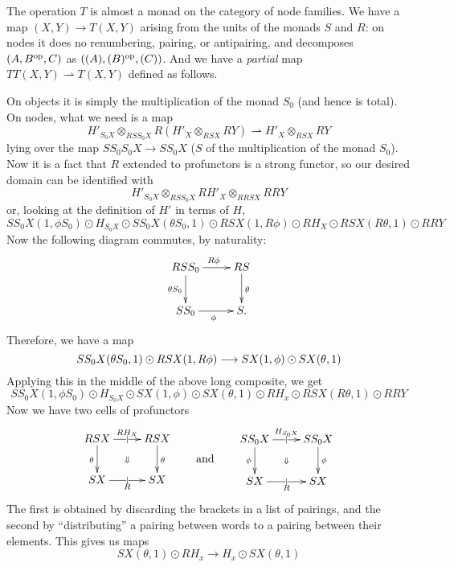 \documentclass{amsart}
\begin{document}
The operation $T$ is almost a monad on the category of node families.
We have a map $(X,Y) \to T(X,Y)$ arising from the units of the monads $S$ and $R$: on nodes it does no renumbering, pairing, or antipairing, and decomposes $(A,B^{\mathrm{op}},C)$ as $((A),(B)^{\mathrm{op}},(C))$.
And we have a \emph{partial} map $TT(X,Y)\rightharpoonup T(X,Y)$ defined as follows.

On objects it is simply the multiplication of the monad $S_0$ (and hence is total).
On nodes, what we need is a map
\[H'_{S_0 X} \otimes_{RSS_0X} R(H'_X \otimes_{RSX} RY) \rightharpoonup H'_X \otimes_{RSX} RY\]
lying over the map $SS_0S_0 X \to SS_0 X$ ($S$ of the multiplication of the monad $S_0$).
Now it is a fact that $R$ extended to profunctors is a strong functor, so our desired domain can be identified with
\[ H'_{S_0 X} \otimes_{RSS_0X} RH'_X \otimes_{RRSX} RRY \]
or, looking at the definition of $H'$ in terms of $H$,
\[ {SS_0X}(1,\phi S_0) \odot %
  H_{S_0 X} \odot %
  SS_0X(\theta S_0,1) \odot %
  RSX(1,R\phi)\odot %
  R H_X \odot %
  RSX(R\theta,1) \odot %
  RRY \]
Now the following diagram commutes, by naturality:
\begin{equation*}
  \vcenter{\xymatrix{
      RSS_0 \ar[r]^{R\phi}\ar[d]_{\theta S_0} &
      RS\ar[d]^{\theta}\\
      SS_0\ar[r]_{\phi} &
      S.
    }}
\end{equation*}
Therefore, we have a map
\[SS_0X(\theta S_0,1) \odot RSX(1,R\phi) \overset{}{\longrightarrow} SX(1,\phi) \odot SX(\theta,1)
\]
Applying this in the middle of the above long composite, we get
\[ {SS_0X}(1,\phi S_0) \odot
  H_{S_0 X} \odot
  SX(1,\phi) \odot
  SX(\theta,1) \odot
  RH_x \odot
  RSX(R\theta,1) \odot 
  RRY \]
Now we have two cells of profunctors
\begin{equation*}
  \vcenter{\xymatrix{
      RSX\ar[r]|{|}^{R H_X}\ar[d]_{\theta} \ar@{}[dr]|{\Downarrow} &
      RSX \ar[d]^{\theta}\\
      SX\ar[r]|{|}_R &
      SX
    }}\qquad\text{and}\qquad
  \vcenter{\xymatrix{
      SS_0X\ar[r]|{|}^{H_{S_0 X}}\ar[d]_{\phi} \ar@{}[dr]|{\Downarrow} &
      SS_0X \ar[d]^{\phi}\\
      SX\ar[r]|{|}_R &
      SX
    }}
\end{equation*}
The first is obtained by discarding the brackets in a list of pairings, and the second by ``distributing'' a pairing between words to a pairing between their elements.
This gives us maps
\[SX(\theta,1) \odot RH_x \to H_x \odot SX(\theta,1) \]
\end{document}
